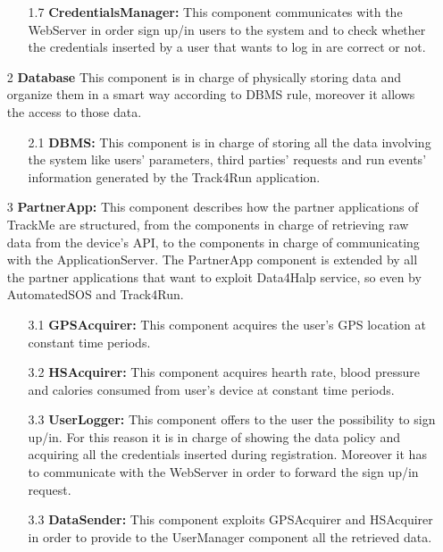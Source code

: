 \begin{enumerate}
\begin{enumerate}
	\item [1.7] \textbf{CredentialsManager: } This component communicates with the WebServer in order sign up/in users to the system and to check whether the credentials inserted by a user that wants to log in are correct or not.
	
	\end{enumerate}
	
\item [2] \textbf{Database} 
This component is in charge of physically storing data and organize them in a smart way according to DBMS rule, moreover it allows the access to those data.

	\begin{enumerate}
	\item [2.1]\textbf{DBMS: }
	This component is in charge of storing all the data involving the system like users' parameters, third parties' requests and run events' information generated by the Track4Run application.
	\end{enumerate}
	
\item [3]\textbf{PartnerApp: }
This component describes how the partner applications of TrackMe are structured, from the components in charge of retrieving raw data from the device's API, to the components in charge of communicating with the  ApplicationServer. The PartnerApp component is extended by all the partner applications that want to exploit Data4Halp service, so even by AutomatedSOS and Track4Run.

	\begin{enumerate}
	\item [3.1]\textbf{GPSAcquirer:}
	This component acquires the user's GPS location at constant time periods.
	
	\item [3.2]\textbf{HSAcquirer:}
	This component acquires hearth rate, blood pressure and calories consumed from user's device at constant time periods.
	
	\item [3.3]\textbf{UserLogger:}
	This component offers to the user the possibility to sign up/in. For this reason it is in charge of showing the data policy and acquiring all the credentials inserted during registration. Moreover it has to communicate with the WebServer in order to forward the sign up/in request.
	 
	\item [3.3]\textbf{DataSender:}
	This component exploits GPSAcquirer and HSAcquirer in order to provide to the UserManager component all the retrieved data.
	\end{enumerate}


\end{enumerate}
